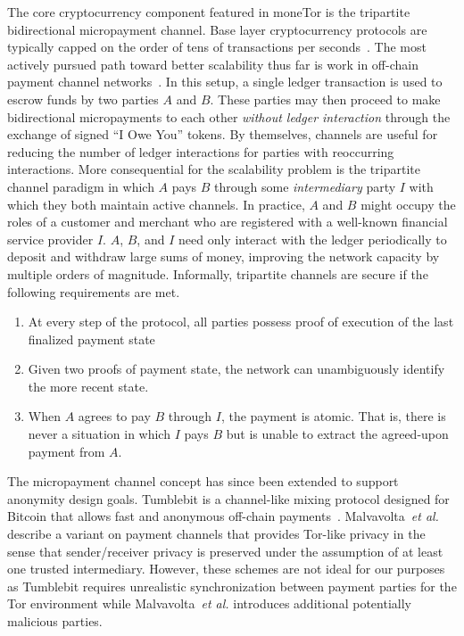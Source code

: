 The core cryptocurrency component featured in
moneTor is the tripartite bidirectional micropayment channel. Base layer
cryptocurrency protocols are typically capped on the order of tens of
transactions per seconds~\cite{team2018blockchain}. The most actively pursued
path toward better scalability thus far is work in off-chain payment channel
networks~\cite{poon2016bitcoin}. In this setup, a single ledger transaction is
used to escrow funds by two parties $A$ and $B$. These parties may then proceed
to make bidirectional micropayments to each other \emph{without ledger
  interaction} through the exchange of signed ``I Owe You'' tokens. By
themselves, channels are useful for reducing the number of ledger interactions
for parties with reoccurring interactions. More consequential for the
scalability problem is the tripartite channel paradigm in which $A$ pays $B$
through some \emph{intermediary} party $I$ with which they both maintain active
channels. In practice, $A$ and $B$ might occupy the roles of a customer and
merchant who are registered with a well-known financial service provider
$I$. $A$, $B$, and $I$ need only interact with the ledger periodically to
deposit and withdraw large sums of money, improving the network capacity by
multiple orders of magnitude. Informally, tripartite channels are secure if the
following requirements are met.

\begin{enumerate}
\item At every step of the protocol, all parties possess proof of execution of
  the last finalized payment state
\item Given two proofs of payment state, the network can unambiguously identify
  the more recent state.
\item When $A$ agrees to pay $B$ through $I$, the payment is atomic. That is,
  there is never a situation in which $I$ pays $B$ but is unable to extract the
  agreed-upon payment from $A$.
\end{enumerate}


The micropayment channel concept has
since been extended to support anonymity design goals. Tumblebit is a
channel-like mixing protocol designed for Bitcoin that allows fast and
anonymous off-chain payments~\cite{heilman2017tumblebit}. Malvavolta~\textit{et al.}~\cite{malavolta2017concurrency}
describe a variant on payment channels that provides Tor-like
privacy in the sense that sender/receiver privacy is preserved under
the assumption of at least one trusted
intermediary. However, these schemes
are not ideal for our purposes as Tumblebit requires
unrealistic synchronization between payment parties for the Tor
environment while Malvavolta~\textit{et al.} introduces
additional potentially malicious parties.

